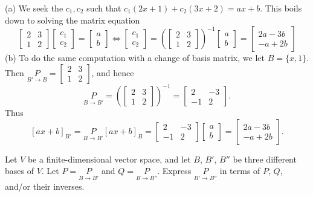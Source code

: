 \begin{solution}
\noindent (a) We seek the $c_1, c_2$ such that $c_1(2x+1)+c_2(3x+2)=ax+b$. This boils down to solving the matrix equation 
\[
\begin{bmatrix}
2&3\\
1&2
\end{bmatrix}
\begin{bmatrix}
c_1\\ c_2
\end{bmatrix}
=\begin{bmatrix}
a\\ b
\end{bmatrix}
\Longleftrightarrow \begin{bmatrix}
c_1\\ c_2
\end{bmatrix}=\left(\begin{bmatrix}
2&3\\
1&2
\end{bmatrix}\right)^{-1}\begin{bmatrix}
a\\ b
\end{bmatrix}=\begin{bmatrix}
2a-3b\\ -a+2b
\end{bmatrix}
\]
(b) To do the same computation with a change of basis matrix, we let $B=\{x, 1\}$. Then $\underset{B'\rightarrow B}{P}=\begin{bmatrix}
2&3\\
1&2
\end{bmatrix}$, and hence 
\[
\underset{B\rightarrow B'}{P}=\left(\begin{bmatrix}
2&3\\
1&2
\end{bmatrix}\right)^{-1}=\begin{bmatrix}
2&-3\\
-1&2
\end{bmatrix}
.
\]
Thus 
\[
[ax+b]_{B'}= \underset{B\rightarrow B'}{P}[ax+b]_B=\begin{bmatrix}
2&-3\\
-1&2
\end{bmatrix}
\begin{bmatrix}
a\\ b
\end{bmatrix}=
\begin{bmatrix}
2a-3b\\
-a+2b
\end{bmatrix}
.
\]

\end{solution}
\ii Let $V$ be a finite-dimensional vector space, and let $B$, $B'$, $B''$ be three different bases of $V$. Let $P=\underset{B\rightarrow B'}{P}$ and $Q=\underset{B\rightarrow B''}{P}$. 
\bb
\ii Express $\underset{B'\rightarrow B''}{P}$ in terms of $P$, $Q$, and/or their inverses. 

